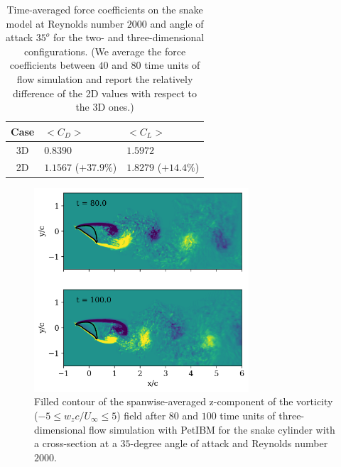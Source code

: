 \documentclass[10pt,journal,compsoc]{IEEEtran}
\begin{document}
\begin{table}[!h]
    \renewcommand{\arraystretch}{1.5}
    \caption{Time-averaged force coefficients on the snake model at Reynolds number $2000$ and angle of attack $35^o$ for the two- and three-dimensional configurations. (We average the force coefficients between $40$ and $80$ time units of flow simulation and report the relatively difference of the 2D values with respect to the 3D ones.)}
    \label{tab:force_coefficients}
    \centering
    \begin{tabular}{cll}
        Case & $<C_D>$ & $<C_L>$ \\
        \hline
        3D & $0.8390$ & $1.5972$ \\
        2D & $1.1567$ ($+37.9\%$) & $1.8279$ ($+14.4\%$) \\
        \hline
    \end{tabular}
\end{table}

\begin{figure}
    \centering
    \includegraphics[width=8cm]{figures/wz_avg_multi_contourf.png}
    \caption{Filled contour of the spanwise-averaged z-component of the vorticity ($-5 \leq w_z c / U_\infty \leq 5$) field after $80$ and $100$ time units of three-dimensional flow simulation with PetIBM for the snake cylinder with a cross-section at a $35$-degree angle of attack and Reynolds number $2000$.}
    \label{fig:wz_avg_3d}
\end{figure}
\end{document}
